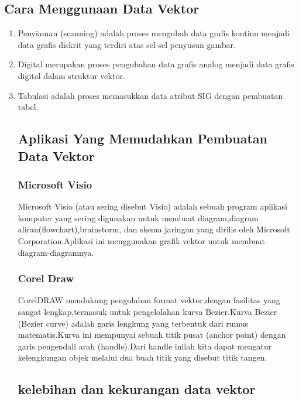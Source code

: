 \subsection { Cara Menggunaan Data Vektor}
\begin{enumerate}
Adapun cara menggunakan data vektor ke dalam SIG dapat dilakukan melalui tiga cara yaitu 
\item Penyiaman (scanning) adalah proses mengubah data grafis kontinu menjadi data grafis diskrit yang terdiri atas sel-sel penyusun gambar.
\item Digital merupakan proses pengubahan data grafis analog menjadi data grafis digital dalam struktur vektor.
\item Tabulasi adalah proses memasukkan data atribut SIG dengan pembuatan tabel.

\subsection {Aplikasi Yang Memudahkan Pembuatan Data Vektor}
\subsubsection {Microsoft Visio}
Microsoft Visio (atau sering disebut Visio) adalah sebuah program aplikasi komputer yang sering digunakan untuk membuat diagram,diagram aliran(flowchart),brainstorm, dan skema jaringan yang dirilis oleh Microsoft Corporation.Aplikasi ini menggunakan grafik vektor untuk membuat diagram-diagramnya.
\subsubsection {Corel Draw}
CorelDRAW mendukung pengolahan format vektor,dengan fasilitas yang sangat lengkap,termasuk untuk pengelolahan kurva Bezier.Kurva Bezier (Bezier curve) adalah garis lengkung yang terbentuk dari rumus matematis.Kurva ini mempunyai sebuah titik pusat (anchor point) dengan garis pengendali arah (handle).Dari handle inilah kita dapat mengatur kelengkungan objek melalui dua buah titik yang disebut titik tangen.

\subsection{kelebihan dan kekurangan data vektor}

\end{enumerate}
